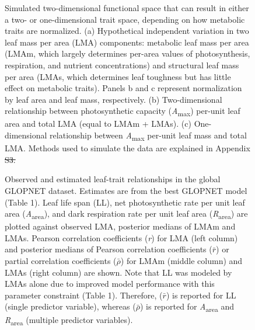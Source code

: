 \documentclass[
  12pt,
  letterpaper,
  DIV=11,
  numbers=noendperiod]{scrartcl}
\providecommand{\DIFadd}[1]{{\protect\color{blue}\uwave{#1}}} %
\providecommand{\DIFdel}[1]{{\protect\color{red}\sout{#1}}}                      %
\providecommand{\DIFaddbegin}{} %
\providecommand{\DIFaddend}{} %
\providecommand{\DIFaddFL}[1]{\DIFadd{#1}} %
\providecommand{\DIFdelFL}[1]{\DIFdel{#1}} %
\providecommand{\DIFaddbeginFL}{} %
\providecommand{\DIFaddendFL}{} %
\providecommand{\DIFdelbeginFL}{} %
\providecommand{\DIFdelendFL}{} %
\newcommand{\DIFscaledelfig}{0.5}
\newlength{\DIFdelgraphicswidth} %
\newlength{\DIFdelgraphicsheight} %
\newcommand{\DIFaddincludegraphics}[2][]{{\color{blue}\fbox{\DIFOincludegraphics[#1]{#2}}}} %
\newcommand{\DIFdelincludegraphics}[2][]{%
\sbox{\DIFdelgraphicsbox}{\DIFOincludegraphics[#1]{#2}}%
\settoboxwidth{\DIFdelgraphicswidth}{\DIFdelgraphicsbox} %
\settoboxtotalheight{\DIFdelgraphicsheight}{\DIFdelgraphicsbox} %
\scalebox{\DIFscaledelfig}{%
\parbox[b]{\DIFdelgraphicswidth}{\usebox{\DIFdelgraphicsbox}\\[-\baselineskip] \rule{\DIFdelgraphicswidth}{0em}}\llap{\resizebox{\DIFdelgraphicswidth}{\DIFdelgraphicsheight}{%
\setlength{\unitlength}{\DIFdelgraphicswidth}%
\begin{picture}(1,1)%
\thicklines\linethickness{2pt} %
{\color[rgb]{1,0,0}\put(0,0){\framebox(1,1){}}}%
{\color[rgb]{1,0,0}\put(0,0){\line( 1,1){1}}}%
{\color[rgb]{1,0,0}\put(0,1){\line(1,-1){1}}}%
\end{picture}%
}\hspace*{3pt}}} %
} %
\DeclareRobustCommand{\DIFaddbegin}{\DIFOaddbegin \let\includegraphics\DIFaddincludegraphics} %
\DeclareRobustCommand{\DIFaddend}{\DIFOaddend \let\includegraphics\DIFOincludegraphics} %
\DeclareRobustCommand{\DIFaddbeginFL}{\DIFOaddbeginFL \let\includegraphics\DIFaddincludegraphics} %
\DeclareRobustCommand{\DIFaddendFL}{\DIFOaddendFL \let\includegraphics\DIFOincludegraphics} %
\DeclareRobustCommand{\DIFdelbeginFL}{\DIFOdelbeginFL \let\includegraphics\DIFdelincludegraphics} %
\DeclareRobustCommand{\DIFdelendFL}{\DIFOaddendFL \let\includegraphics\DIFOincludegraphics} %
\begin{document}
\begin{figure}


\caption{\label{fig-hypo}Simulated two-dimensional functional space that
can result in either a two- or one-dimensional trait space, depending on
how metabolic traits are normalized. (a) Hypothetical independent
variation in two leaf mass per area (LMA) components: metabolic leaf
mass per area (LMAm, which largely determines per-area values of
photosynthesis, respiration, and nutrient concentrations) and structural
leaf mass per area (LMAs, which determines leaf toughness but has little
effect on metabolic traits). Panels b and c represent normalization by
leaf area and leaf mass, respectively. (b) Two-dimensional relationship
between photosynthetic capacity (\emph{A}\textsubscript{max}) per-unit
leaf area and total LMA (equal to LMAm + LMAs). (c) One-dimensional
relationship between \emph{A}\textsubscript{max} per-unit leaf mass and
total LMA. Methods used to simulate the data are explained in Appendix
\DIFdelbeginFL \DIFdelFL{S3.}\DIFdelendFL \DIFaddbeginFL \DIFaddFL{S8}\DIFaddendFL }

\end{figure}%

\DIFaddbegin \newpage

\DIFaddend \begin{figure}


\caption{\label{fig-gl_point}Observed and estimated leaf-trait
relationships in the global GLOPNET dataset. Estimates are from the best
GLOPNET model (Table 1). Leaf life span (LL), net photosynthetic rate
per unit leaf area (\emph{A}\textsubscript{area}), and dark respiration
rate per unit leaf area (\emph{R}\textsubscript{area}) are plotted
against observed LMA, posterior medians of LMAm and LMAs. Pearson
correlation coefficients (\emph{r}) for LMA (left column) and posterior
medians of Pearson correlation coefficients (\(\bar{r}\)) or partial
correlation coefficients (\(\bar{\rho}\)) for LMAm (middle column) and
LMAs (right column) are shown. Note that LL was modeled by LMAs alone
due to improved model performance with this parameter constraint (Table
1). Therefore, (\(\bar{r}\)) is reported for LL (single predictor
variable), whereas (\(\bar{\rho}\)) is reported for
\emph{A}\textsubscript{area} and \emph{R}\textsubscript{area} (multiple
predictor variables).}

\end{figure}%
\end{document}
